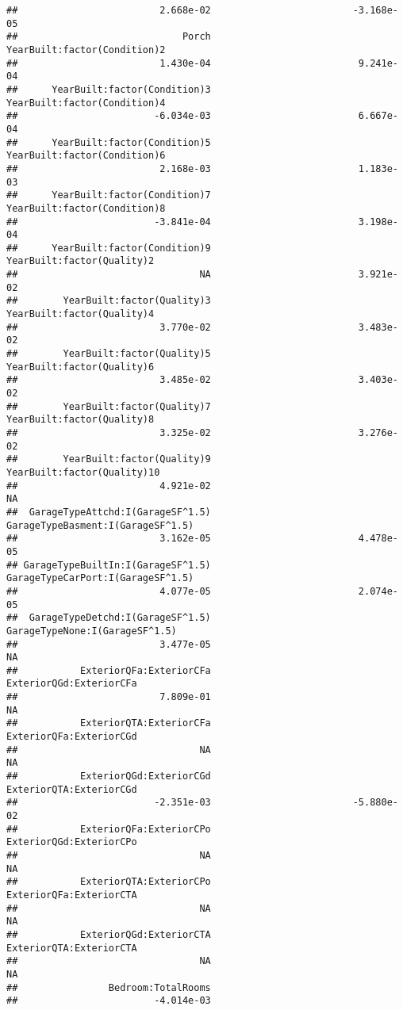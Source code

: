 \documentclass[
]{article}
\begin{document}
\begin{verbatim}
##                         2.668e-02                         -3.168e-05  
##                             Porch       YearBuilt:factor(Condition)2  
##                         1.430e-04                          9.241e-04  
##      YearBuilt:factor(Condition)3       YearBuilt:factor(Condition)4  
##                        -6.034e-03                          6.667e-04  
##      YearBuilt:factor(Condition)5       YearBuilt:factor(Condition)6  
##                         2.168e-03                          1.183e-03  
##      YearBuilt:factor(Condition)7       YearBuilt:factor(Condition)8  
##                        -3.841e-04                          3.198e-04  
##      YearBuilt:factor(Condition)9         YearBuilt:factor(Quality)2  
##                                NA                          3.921e-02  
##        YearBuilt:factor(Quality)3         YearBuilt:factor(Quality)4  
##                         3.770e-02                          3.483e-02  
##        YearBuilt:factor(Quality)5         YearBuilt:factor(Quality)6  
##                         3.485e-02                          3.403e-02  
##        YearBuilt:factor(Quality)7         YearBuilt:factor(Quality)8  
##                         3.325e-02                          3.276e-02  
##        YearBuilt:factor(Quality)9        YearBuilt:factor(Quality)10  
##                         4.921e-02                                 NA  
##  GarageTypeAttchd:I(GarageSF^1.5)  GarageTypeBasment:I(GarageSF^1.5)  
##                         3.162e-05                          4.478e-05  
## GarageTypeBuiltIn:I(GarageSF^1.5)  GarageTypeCarPort:I(GarageSF^1.5)  
##                         4.077e-05                          2.074e-05  
##  GarageTypeDetchd:I(GarageSF^1.5)     GarageTypeNone:I(GarageSF^1.5)  
##                         3.477e-05                                 NA  
##           ExteriorQFa:ExteriorCFa            ExteriorQGd:ExteriorCFa  
##                         7.809e-01                                 NA  
##           ExteriorQTA:ExteriorCFa            ExteriorQFa:ExteriorCGd  
##                                NA                                 NA  
##           ExteriorQGd:ExteriorCGd            ExteriorQTA:ExteriorCGd  
##                        -2.351e-03                         -5.880e-02  
##           ExteriorQFa:ExteriorCPo            ExteriorQGd:ExteriorCPo  
##                                NA                                 NA  
##           ExteriorQTA:ExteriorCPo            ExteriorQFa:ExteriorCTA  
##                                NA                                 NA  
##           ExteriorQGd:ExteriorCTA            ExteriorQTA:ExteriorCTA  
##                                NA                                 NA  
##                Bedroom:TotalRooms  
##                        -4.014e-03
\end{verbatim}
\end{document}

